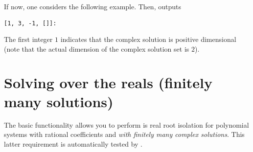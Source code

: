 \documentclass[a4paper,english,11pt]{scrartcl}
\theoremstyle{definition}
\theoremstyle{remark}
\begin{document}
If now, one considers the following example.
Then, \msolve outputs
\begin{tcolorbox} %
  \begin{lstlisting}[basicstyle=\normalsize\ttfamily]
[1, 3, -1, []]:
  \end{lstlisting}
\end{tcolorbox}
The first integer $1$ indicates that the complex solution is positive
dimensional (note that the actual dimension of the complex solution set is $2$).


\section{Solving over the reals (finitely many solutions)}\label{sec:solvingreals}

The basic functionality \msolve allows you to perform is real root
isolation for polynomial systems with rational coefficients and {\em with
  finitely many complex solutions}. This latter requirement is automatically
tested by \msolve.
\end{document}
